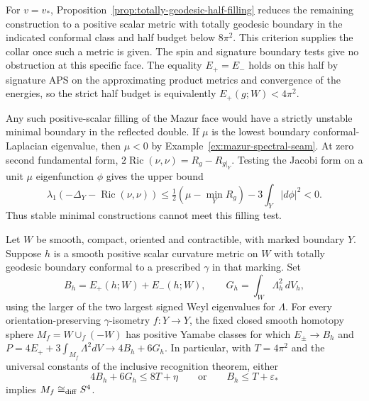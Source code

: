 For \(v=v_*\), Proposition~\ref{prop:totally-geodesic-half-filling}
reduces the remaining construction to a positive scalar
metric with totally geodesic boundary in the indicated
conformal class and half budget below \(8\pi^2\). This
criterion supplies the collar once such a metric is given.
The spin and signature boundary tests give no obstruction
at this specific face. The equality \(E_+=E_-\) holds on
this half by signature APS on the approximating product
metrics and convergence of the energies, so the strict
half budget is equivalently \(E_+(g;W)<4\pi^2\).

Any such positive-scalar filling of the Mazur face would
have a strictly unstable minimal boundary in the reflected
double. If \(\mu\) is the lowest boundary conformal-Laplacian
eigenvalue, then \(\mu<0\) by
Example~\ref{ex:mazur-spectral-seam}. At zero second fundamental
form, \(2\operatorname{Ric}(\nu,\nu)=R_g-R_{g|_Y}\).
Testing the Jacobi form on a unit \(\mu\) eigenfunction
\(\phi\) gives the upper bound
\[
 \lambda_1(-\Delta_Y-\operatorname{Ric}(\nu,\nu))
 \le \tfrac12(\mu-\min_Y R_g)-3\int_Y|d\phi|^2<0.
\]
Thus stable minimal constructions cannot meet this filling test.

\begin{corollary}
\label{cor:inclusive-isometric-filling}
Let \(W\) be smooth, compact, oriented and contractible, with
marked boundary \(Y\). Suppose \(h\) is a smooth positive
scalar curvature metric on \(W\) with totally geodesic boundary
conformal to a prescribed \(\gamma\) in that marking. Set
\[
 B_h=E_+(h;W)+E_-(h;W),\qquad G_h=\int_W\Lambda_h^2\,dV_h,
\]
using the larger of the two largest signed Weyl eigenvalues
for \(\Lambda\). For every orientation-preserving
\(\gamma\)-isometry \(f:Y\to Y\), the fixed closed smooth
homotopy sphere \(M_f=W\cup_f(-W)\) has positive Yamabe
classes for which \(E_\pm\to B_h\) and
\(P=4E_++3\int_{M_f}\Lambda^2dV\to 4B_h+6G_h\).
In particular, with \(T=4\pi^2\) and the universal
constants of the inclusive recognition theorem, either
\[
 4B_h+6G_h\le8T+\eta\qquad\text{or}\qquad
 B_h\le T+\varepsilon_*
\]
implies \(M_f\cong_{\rm diff} S^4\).
\cite[section on the uniform isotropic spectral gap]{Baker2026FixedDescent}
\end{corollary}

